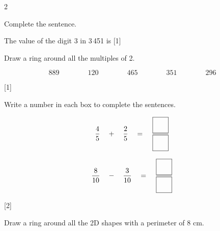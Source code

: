 \documentclass[12pt]{article}
\newcommand{\QuestionMarks}[1]{\hfill [#1]}
\newcommand{\AnswerLine}[1]{\makebox[#1]{\hrulefill}}
\newcommand{\FractionAnswerBox}{\fbox{\rule{0pt}{0.55cm}\rule{0.55cm}{0pt}}}
\newcommand{\BoxedQuestionLabel}[1]{%
	\begingroup
	\setlength{\fboxsep}{0pt}%
	\raisebox{-0.12cm}{%
		\fbox{%
			\makebox[0.68cm][c]{\rule[-0.18cm]{0pt}{0.68cm}\textbf{#1}}%
		}%
	}%
	\endgroup
}
\begin{document}
	\raggedcolumns
	\begin{multicols}{2}
		\begin{enumerate}[
			label=\BoxedQuestionLabel{\arabic*},
			leftmargin=1.1cm,
			labelwidth=0.72cm,
			labelsep=0.25cm,
			itemsep=0pt,
			topsep=0pt,
			parsep=0pt
			]
			
			\item
			Complete the sentence.
			
			\vspace{0.45cm}
			
			The value of the digit 3 in 3\,451 is
			\hfill \AnswerLine{4.6cm} \QuestionMarks{1}
			
			\vspace{0.85cm}
			
			\item
			Draw a ring around all the multiples of 2.
			
			\vspace{0.65cm}
			
			\[
			889
			\qquad\qquad
			120
			\qquad\qquad
			465
			\qquad\qquad
			351
			\qquad\qquad
			296
			\]
			
			\vspace{0.35cm}
			
			\QuestionMarks{1}
			
			\vspace{0.95cm}
			
			\item
			Write a number in each box to complete the sentences.
			
			\vspace{0.65cm}
			
			\[
			\frac{4}{5}
			\quad + \quad
			\frac{2}{5}
			\quad = \quad
			\frac{\FractionAnswerBox}{\FractionAnswerBox}
			\]
			
			\vspace{0.95cm}
			
			\[
			\frac{8}{10}
			\quad - \quad
			\frac{3}{10}
			\quad = \quad
			\frac{\FractionAnswerBox}{\FractionAnswerBox}
			\]
			
			\vspace{0.35cm}
			
			\QuestionMarks{2}
			
			\vspace{0.8cm}
			
			\item
			Draw a ring around all the 2D shapes with a perimeter of 8 cm.
			
			\vspace{0.35cm}
			

\end{enumerate}
\end{multicols}
\end{document}
